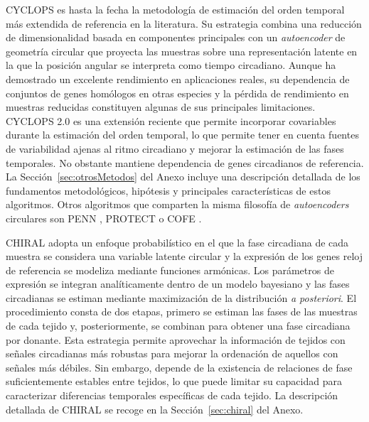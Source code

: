 \documentclass[12pt, a4paper]{report}
\begin{document}
CYCLOPS es hasta la fecha la metodología de estimación del orden temporal más extendida de referencia en la literatura. Su estrategia combina una reducción de dimensionalidad basada en componentes principales con un \textit{autoencoder} de geometría circular que proyecta las muestras sobre una representación latente en la que la posición angular se interpreta como tiempo circadiano. Aunque ha demostrado un excelente rendimiento en aplicaciones reales, su dependencia de conjuntos de genes homólogos en otras especies y la pérdida de rendimiento en muestras reducidas constituyen algunas de sus principales limitaciones. CYCLOPS 2.0 es una extensión reciente que permite incorporar covariables durante la estimación del orden temporal, lo que permite tener en cuenta fuentes de variabilidad ajenas al ritmo circadiano y mejorar la estimación de las fases temporales. No obstante mantiene dependencia de genes circadianos de referencia. La Sección~\ref{sec:otrosMetodos} del Anexo incluye una descripción detallada de los fundamentos metodológicos, hipótesis y principales características de estos algoritmos. Otros algoritmos que comparten la misma filosofía de \textit{autoencoders} circulares son PENN \cite{penn2023}, PROTECT \cite{protect} o COFE \cite{cofe}.

CHIRAL adopta un enfoque probabilístico en el que la fase circadiana de cada muestra se considera una variable latente circular y la expresión de los genes reloj de referencia se modeliza mediante funciones armónicas. Los parámetros de expresión se integran analíticamente dentro de un modelo bayesiano y las fases circadianas se estiman mediante maximización de la distribución \textit{a posteriori}. El procedimiento consta de dos etapas, primero se estiman las fases de las muestras de cada tejido y, posteriormente, se combinan para obtener una fase circadiana por donante. Esta estrategia permite aprovechar la información de tejidos con señales circadianas más robustas para mejorar la ordenación de aquellos con señales más débiles. Sin embargo, depende de la existencia de relaciones de fase suficientemente estables entre tejidos, lo que puede limitar su capacidad para caracterizar diferencias temporales específicas de cada tejido. La descripción detallada de CHIRAL se recoge en la Sección~\ref{sec:chiral} del Anexo.
\end{document}
